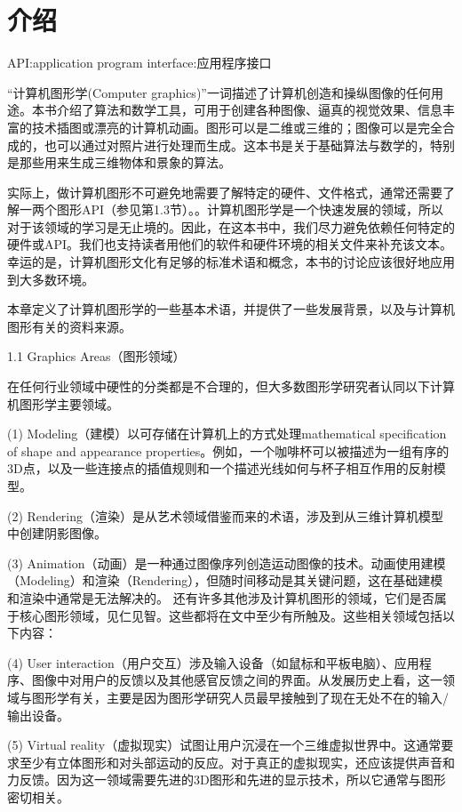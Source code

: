 

\chapter{介绍}
\label{chap01}

API:application program interface:应用程序接口

“计算机图形学(Computer graphics)”一词描述了计算机创造和操纵图像的任何用途。本书介绍了算法和数学工具，可用于创建各种图像、逼真的视觉效果、信息丰富的技术插图或漂亮的计算机动画。图形可以是二维或三维的；图像可以是完全合成的，也可以通过对照片进行处理而生成。这本书是关于基础算法与数学的，特别是那些用来生成三维物体和景象的算法。

实际上，做计算机图形不可避免地需要了解特定的硬件、文件格式，通常还需要了解一两个图形API（参见第1.3节）。。计算机图形学是一个快速发展的领域，所以对于该领域的学习是无止境的。因此，在这本书中，我们尽力避免依赖任何特定的硬件或API。我们也支持读者用他们的软件和硬件环境的相关文件来补充该文本。幸运的是，计算机图形文化有足够的标准术语和概念，本书的讨论应该很好地应用到大多数环境。

本章定义了计算机图形学的一些基本术语，并提供了一些发展背景，以及与计算机图形有关的资料来源。

1.1 Graphics Areas（图形领域）

在任何行业领域中硬性的分类都是不合理的，但大多数图形学研究者认同以下计算机图形学主要领域。

(1) Modeling（建模）以可存储在计算机上的方式处理mathematical specification of shape and appearance properties。例如，一个咖啡杯可以被描述为一组有序的3D点，以及一些连接点的插值规则和一个描述光线如何与杯子相互作用的反射模型。

(2) Rendering（渲染）是从艺术领域借鉴而来的术语，涉及到从三维计算机模型中创建阴影图像。

(3) Animation（动画）是一种通过图像序列创造运动图像的技术。动画使用建模（Modeling）和渲染（Rendering），但随时间移动是其关键问题，这在基础建模和渲染中通常是无法解决的。
还有许多其他涉及计算机图形的领域，它们是否属于核心图形领域，见仁见智。这些都将在文中至少有所触及。这些相关领域包括以下内容：

(4) User interaction（用户交互）涉及输入设备（如鼠标和平板电脑）、应用程序、图像中对用户的反馈以及其他感官反馈之间的界面。从发展历史上看，这一领域与图形学有关，主要是因为图形学研究人员最早接触到了现在无处不在的输入/输出设备。

(5) Virtual reality（虚拟现实）试图让用户沉浸在一个三维虚拟世界中。这通常要求至少有立体图形和对头部运动的反应。对于真正的虚拟现实，还应该提供声音和力反馈。因为这一领域需要先进的3D图形和先进的显示技术，所以它通常与图形密切相关。

